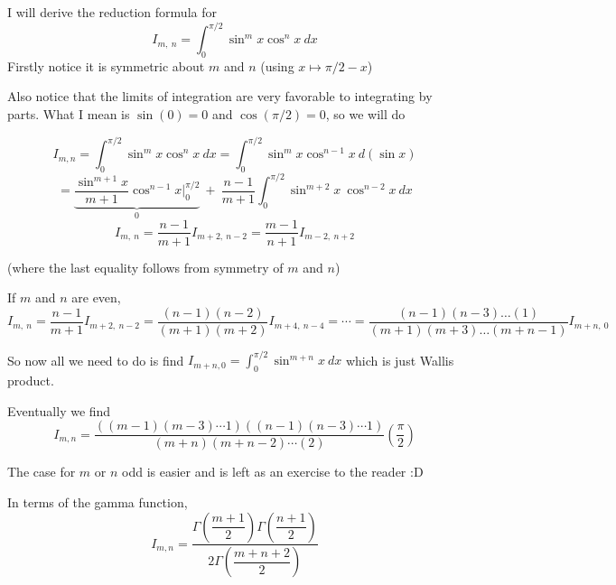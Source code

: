 \documentclass[11]{article}
\title{\sc{Boring Integrals}}
\author{\sc{Rahul}}
\date{25 March, 2025}
\begin{document}
\maketitle
I will derive the reduction formula for $$I_{m, \ n} = \int_0^{\pi/2} \sin^m x \cos^n x \  dx$$
Firstly notice it is symmetric about $m$ and $n$ (using $x \mapsto \pi/2 - x$)

Also notice that the limits of integration are very favorable to integrating by parts. What I mean is $\sin(0) = 0$ and $\cos(\pi/2) = 0$, so we will do

$$I_{m, n} = \int_0^{\pi/2} \sin^m x \cos^n x \ dx = \int_0^{\pi/2} \sin^m x \cos^{n-1} x \  d(\sin x) $$
$$= \underbrace{ \frac{\sin^{m+1} x}{m+1} \cos^{n-1} x \Bigr\rvert_0^{\pi/2} }_{0} \ + \  \frac{n-1}{m+1}\int_0^{\pi/2} \sin^{m+2} x \ \cos^{n-2} x \ dx$$
$$I_{m, \ n} = \frac{n-1}{m+1} I_{m+2, \ n-2} = \frac{m-1}{n+1} I_{m-2, \ n+2}$$

(where the last equality follows from symmetry of $m$ and $n$)

If $m$ and $n$ are even, 
$$I_{m, \ n} = \frac{n-1}{m+1} I_{m+2, \ n-2} = \frac{(n-1)(n-2)}{(m+1)(m+2)} I_{m+4, \ n-4} = \cdots= \frac{(n-1)(n-3)\dots(1)}{(m+1)(m+3)\dots(m+n-1)} I_{m+n, \ 0}$$

So now all we need to do is find $I_{m+n, 0} = \int_0^{\pi/2} \sin^{m+n} x \ dx$
which is just Wallis product.

Eventually we find $$I_{m,n} = \frac{((m-1)(m-3) \cdots 1)((n-1)(n-3) \cdots 1)}{(m+n)(m+n-2) \cdots (2)} \left(\frac{\pi}{2}\right)$$

The case for $m$ or $n$ odd is easier and is left as an exercise to the reader  :D 

In terms of the gamma function, 
$$I_{m, n} = \dfrac{\Gamma\left(\dfrac{m + 1}{2}\right) \Gamma\left(\dfrac{n + 1}{2}\right)}{2 \Gamma\left(\dfrac{m + n + 2}{2}\right)}$$
\end{document}
